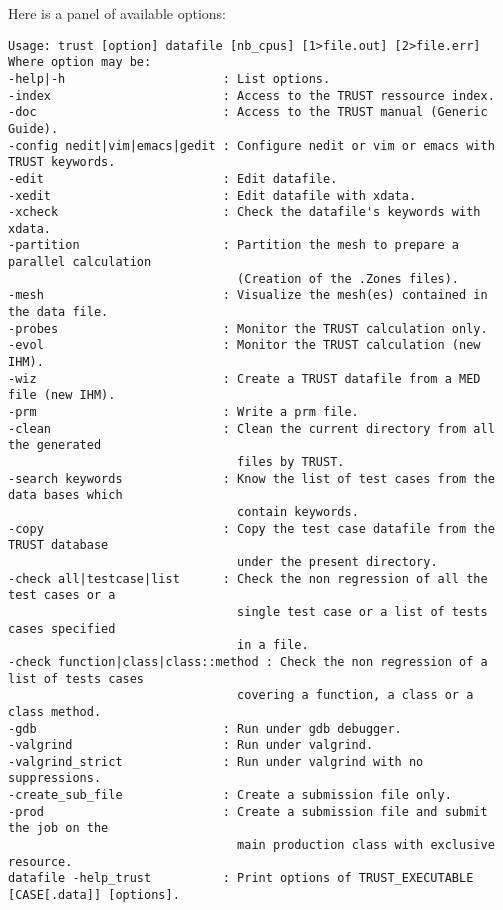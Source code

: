 Here is a panel of available options:
\begin{verbatim}
Usage: trust [option] datafile [nb_cpus] [1>file.out] [2>file.err]
Where option may be:
-help|-h                      : List options.
-index                        : Access to the TRUST ressource index.
-doc                          : Access to the TRUST manual (Generic Guide).
-config nedit|vim|emacs|gedit : Configure nedit or vim or emacs with TRUST keywords.
-edit                         : Edit datafile.
-xedit                        : Edit datafile with xdata.
-xcheck                       : Check the datafile's keywords with xdata.
-partition                    : Partition the mesh to prepare a parallel calculation 
                                (Creation of the .Zones files).
-mesh                         : Visualize the mesh(es) contained in the data file.
-probes                       : Monitor the TRUST calculation only.
-evol                         : Monitor the TRUST calculation (new IHM).
-wiz                          : Create a TRUST datafile from a MED file (new IHM).
-prm                          : Write a prm file.
-clean                        : Clean the current directory from all the generated 
                                files by TRUST.
-search keywords              : Know the list of test cases from the data bases which 
                                contain keywords.
-copy                         : Copy the test case datafile from the TRUST database 
                                under the present directory. 
-check all|testcase|list      : Check the non regression of all the test cases or a 
                                single test case or a list of tests cases specified 
                                in a file.
-check function|class|class::method : Check the non regression of a list of tests cases
                                covering a function, a class or a class method.
-gdb                          : Run under gdb debugger.
-valgrind                     : Run under valgrind.
-valgrind_strict              : Run under valgrind with no suppressions. 
-create_sub_file              : Create a submission file only. 
-prod                         : Create a submission file and submit the job on the 
                                main production class with exclusive resource. 
datafile -help_trust          : Print options of TRUST_EXECUTABLE [CASE[.data]] [options]. 
\end{verbatim}



